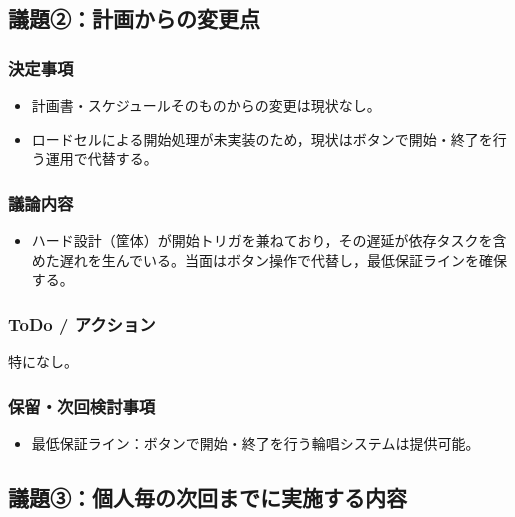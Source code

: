 \documentclass[a4paper,12pt]{ltjsarticle}
\begin{document}
\subsection*{議題②：計画からの変更点}

\subsubsection*{決定事項}
\begin{itemize}[leftmargin=1.5em]
  \item 計画書・スケジュールそのものからの変更は現状なし。
  \item ロードセルによる開始処理が未実装のため，現状はボタンで開始・終了を行う運用で代替する。
\end{itemize}

\subsubsection*{議論内容}
\begin{itemize}[leftmargin=1.5em]
  \item ハード設計（筐体）が開始トリガを兼ねており，その遅延が依存タスクを含めた遅れを生んでいる。当面はボタン操作で代替し，最低保証ラインを確保する。
\end{itemize}

\subsubsection*{ToDo / アクション}
特になし。

\subsubsection*{保留・次回検討事項}
\begin{itemize}[leftmargin=1.5em]
  \item 最低保証ライン：ボタンで開始・終了を行う輪唱システムは提供可能。
\end{itemize}

\subsection*{議題③：個人毎の次回までに実施する内容}
\end{document}
